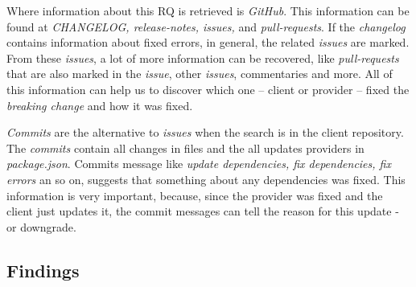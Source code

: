 Where information about this RQ is retrieved is \textit{GitHub}. This information can be found at \textit{CHANGELOG, release-notes, issues,} and \textit{pull-requests}. If the \textit{changelog} contains information about fixed errors, in general, the related \textit{issues} are marked. From these \textit{issues}, a lot of more information can be recovered, like \textit{pull-requests} that are also marked in the \textit{issue}, other \textit{issues}, commentaries and more. All of this information can help us to discover which one -- client or provider -- fixed the \textit{breaking change} and how it was fixed.

\textit{Commits} are the alternative to \textit{issues} when the search is in the client repository. The \textit{commits} contain all changes in files and the all updates providers in \textit{package.json}. Commits message like \textit{update dependencies, fix dependencies, fix errors} an so on, suggests that something about any dependencies was fixed. This information is very important, because, since the provider was fixed and the client just updates it, the commit messages can tell the reason for this update - or downgrade.

\subsection{Findings}
\label{fin:rq3}